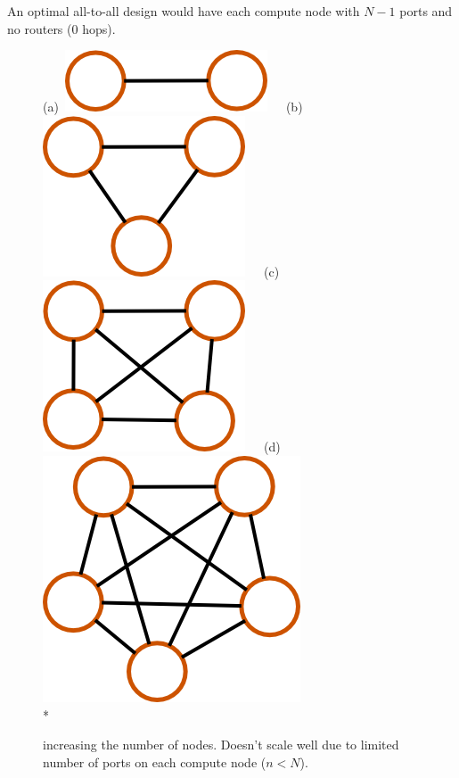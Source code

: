 \documentclass[pdftex]{article}
\begin{document}
An optimal all-to-all design would have each compute node with $N-1$ ports and no routers (0 hops).
\begin{figure}[h!]
\begin{center}
(a)\ \includegraphics[scale=0.2]{pictures/N2_n1_M0_mNA}\ \ \ 
(b)\includegraphics[scale=0.2]{pictures/N3_n1_M0_mNA}\ \ \ 
(c)\ \includegraphics[scale=0.2]{pictures/N4_n1_M0_mNA}\ \ \ 
(d)\includegraphics[scale=0.2]{pictures/N5_n1_M0_mNA}\\*
\caption{increasing the number of nodes. Doesn't scale well due to limited number of ports on each compute node ($n<N$).}
\end{center}
\end{figure}
\end{document}
